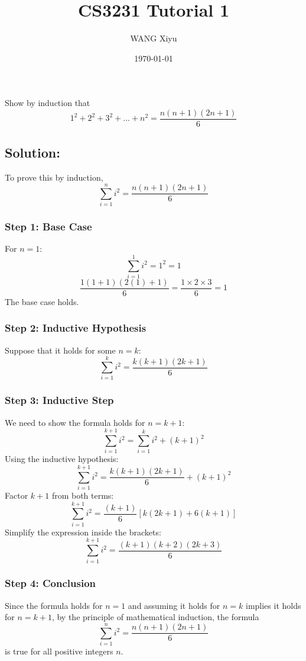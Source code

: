 \documentclass[12pt]{article}
\title{CS3231 Tutorial 1}
\author{WANG Xiyu}
\date{\today}
\begin{document}
\maketitle

\tableofcontents 

\section{}
Show by induction that
\[
    1^2 + 2^2 + 3^2 + ... + n^2 = \frac{n(n+1)(2n+1)}{6}    
\]
\subsection*{Solution:}

To prove this by induction, 
\[
\sum_{i = 1}^{n} i^2 = \frac{n(n+1)(2n+1)}{6}
\]

\subsubsection*{Step 1: Base Case}
For \(n = 1\):
\[
\sum_{i=1}^{1} i^2 = 1^2 = 1
\]
\[
\frac{1(1+1)(2(1)+1)}{6} = \frac{1 \times 2 \times 3}{6} = 1
\]
The base case holds.

\subsubsection*{Step 2: Inductive Hypothesis}
Suppose that it holds for some \(n = k\):
\[
\sum_{i = 1}^{k} i^2 = \frac{k(k+1)(2k+1)}{6}
\]

\subsubsection*{Step 3: Inductive Step}
We need to show the formula holds for \(n = k+1\):
\[
\sum_{i=1}^{k+1} i^2 = \sum_{i=1}^{k} i^2 + (k+1)^2
\]
Using the inductive hypothesis:
\[
\sum_{i=1}^{k+1} i^2 = \frac{k(k+1)(2k+1)}{6} + (k+1)^2
\]
Factor \(k+1\) from both terms:
\[
\sum_{i=1}^{k+1} i^2 = \frac{(k+1)}{6} \left[k(2k+1) + 6(k+1)\right]
\]
Simplify the expression inside the brackets:
\[
\sum_{i=1}^{k+1} i^2 = \frac{(k+1)(k+2)(2k+3)}{6}
\]

\subsubsection*{Step 4: Conclusion}
Since the formula holds for \(n = 1\) and assuming it holds for \(n = k\) implies it holds for \(n = k+1\), by the principle of mathematical induction, the formula
\[
\sum_{i = 1}^{n} i^2 = \frac{n(n+1)(2n+1)}{6}
\]
is true for all positive integers \(n\).
\end{document}
